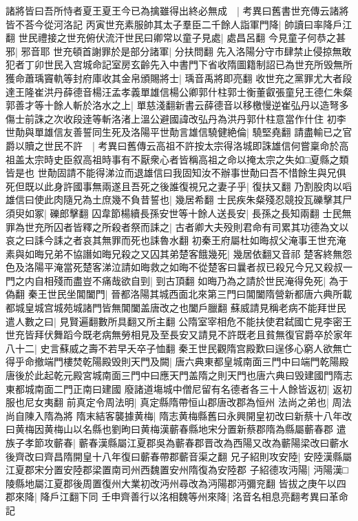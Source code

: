 諸將皆曰吾所恃者夏王夏王今已為擒雖得出終必無成　|{
	考異曰舊書世充傳云諸將皆不荅今從河洛記}
丙寅世充素服帥其太子羣臣二千餘人詣軍門降|{
	帥讀曰率降戶江翻}
世民禮接之世充俯伏流汗世民曰卿常以童子見處|{
	處昌呂翻}
今見童子何恭之甚邪|{
	邪音耶}
世充頓首謝罪於是部分諸軍|{
	分扶問翻}
先入洛陽分守市肆禁止侵掠無敢犯者丁卯世民入宫城命記室房玄齡先入中書門下省收隋圖籍制詔已為世充所毁無所獲命蕭瑀竇軌等封府庫收其金帛頒賜將士|{
	瑀音禹將即亮翻}
收世充之黨罪尤大者段達王隆崔洪丹薛德音楊汪孟孝義單雄信楊公卿郭什柱郭士衡董叡張童兒王德仁朱粲郭善才等十餘人斬於洛水之上|{
	單慈淺翻新書云薛德音以移檄慢逆崔弘丹以造弩多傷士前誅之次收段逹等斬洛渚上溫公避國諱改弘丹為洪丹郭什柱意當作什住}
初李世勣與單雄信友善誓同生死及洛陽平世勣言雄信驍健絶倫|{
	驍堅堯翻}
請盡輸已之官爵以贖之世民不許　|{
	考異曰舊傳云高祖不許按太宗得洛城即誅雄信何嘗稟命於高祖盖太宗時史臣叙高祖時事有不厭衆心者皆稱高祖之命以掩太宗之失如□夏縣之類皆是也}
世勣固請不能得涕泣而退雄信曰我固知汝不辦事世勣曰吾不惜餘生與兄俱死但既以此身許國事無兩遂且吾死之後誰復視兄之妻子乎|{
	復扶又翻}
乃割股肉以㗖雄信曰使此肉隨兄為土庶幾不負昔誓也|{
	幾居希翻}
士民疾朱粲殘忍競投瓦礫擊其尸須臾如冢|{
	礫郎擊翻}
囚韋節楊續長孫安世等十餘人送長安|{
	長孫之長知兩翻}
士民無罪為世充所囚者皆釋之所殺者祭而誄之|{
	古者卿大夫殁則君命有司累其功德為文以哀之曰誄今誄之者哀其無罪而死也誄魯水翻}
初秦王府屬杜如晦叔父淹事王世充淹素與如晦兄弟不協譖如晦兄殺之又囚其弟楚客餓幾死|{
	幾居依翻又音祁}
楚客終無怨色及洛陽平淹當死楚客涕泣請如晦救之如晦不從楚客曰曩者叔已殺兄今兄又殺叔一門之内自相殘而盡豈不痛哉欲自剄|{
	剄古頂翻}
如晦乃為之請於世民淹得免死|{
	為于偽翻}
秦王世民坐閶闔門|{
	晉都洛陽其城西面北來第三門曰閶闔隋營新都唐六典所載都城皇城宫城苑城諸門皆無閶闔盖唐改之也闔戶臘翻}
蘇威請見稱老病不能拜世民遣人數之曰|{
	見賢遍翻數所具翻又所主翻}
公隋室宰相危不能扶使君弑國亡見李密王世充皆拜伏舞蹈今既老病無勞相見及至長安又請見不許既老且貧無復官爵卒於家年八十二|{
	史言蘇威之壽不若早夭卒子恤翻}
秦王世民觀隋宫殿歎曰逞侈心窮人欲無亡得乎命撤端門樓焚乾陽殿毁則天門及闕|{
	唐六典東都皇城南面三門中曰端門乾陽殿唐後於此起乾元殿宮城南面三門中曰應天門盖隋之則天門也唐六典曰毁建國門隋志東都城南面二門正南曰建國}
廢諸道塲城中僧尼留有名德者各三十人餘皆返初|{
	返初服也尼女夷翻}
前真定令周法明|{
	真定縣隋帶恒山郡唐改郡為恒州}
法尚之弟也|{
	周法尚自陳入隋為將}
隋末結客襲據黄梅|{
	隋志黄梅縣舊曰永興開皇初改曰新蔡十八年改曰黄梅因黄梅山以名縣也劉昫曰黄梅漢蘄春縣地宋分置新蔡郡隋為縣屬蘄春郡}
遣族子孝節攻蘄春|{
	蘄春漢縣屬江夏郡吳為蘄春郡晋改為西陽又改為蘄陽梁改曰蘄水後齊改曰齊昌隋開皇十八年復曰蘄春帶郡蘄音渠之翻}
兄子紹則攻安陸|{
	安陸漢縣屬江夏郡宋分置安陸郡梁置南司州西魏置安州隋復為安陸郡}
子紹德攻沔陽|{
	沔陽漢□陵縣地屬江夏郡後周置復州大業初改沔州尋改為沔陽郡沔彌兖翻}
皆拔之庚午以四郡來降|{
	降戶江翻下同}
壬申齊善行以洺相魏等州來降|{
	洺音名相息亮翻考異曰革命記}


